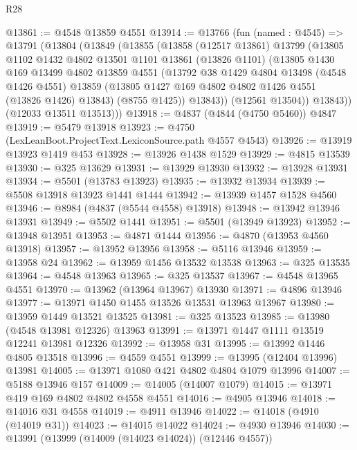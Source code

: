 \begin{lexlean}{R28}
\begin{coremodule}
@13861 := @4548 @13859 @4551
@13914 := @13766
    (fun (named : @4545) =>
    @13791
      (@13804
        (@13849
          (@13855
            (@13858
              (@12517 @13861)
              @13799
              (@13805
                @1102
                @1432
                @4802
                @13501
                @1101
                @13861
                (@13826 @1101)
                (@13805
                  @1430
                  @169
                  @13499
                  @4802
                  @13859
                  @4551
                  (@13792
                    @38
                    @1429
                    @4804
                    @13498
                    (@4548 @1426 @4551)
                    @13859
                    (@13805 @1427 @169 @4802 @4802 @1426 @4551 (@13826 @1426) @13843)
                    (@8755 @1425))
                  @13843))
              (@12561 @13504))
            @13843))
        (@12033 @13511 @13513)))
@13918 := @4837 (@4844 (@4750 @5460)) @4847
@13919 := @5479 @13918
@13923 := @4750 (LexLeanBoot.ProjectText.LexiconSource.path @4557 @4543)
@13926 := @13919 @13923 @1419 @453
@13928 := @13926 @1438 @1529
@13929 := @4815 @13539
@13930 := @325 @13629
@13931 := @13929 @13930
@13932 := @13928 @13931
@13934 := @5501 (@13783 @13923)
@13935 := @13932 @13934
@13939 := @5508 @13918 @13923 @1441 @1444
@13942 := @13939 @1457 @1528 @4560
@13946 := @8984 (@4837 (@5544 @4558) @13918)
@13948 := @13942 @13946 @13931
@13949 := @5502 @1441
@13951 := @5501 (@13949 @13923)
@13952 := @13948 @13951
@13953 := @4871 @1444
@13956 := @4870 (@13953 @4560 @13918)
@13957 := @13952 @13956
@13958 := @5116 @13946
@13959 := @13958 @24
@13962 := @13959 @1456 @13532 @13538
@13963 := @325 @13535
@13964 := @4548 @13963
@13965 := @325 @13537
@13967 := @4548 @13965 @4551
@13970 := @13962 (@13964 @13967) @13930
@13971 := @4896 @13946
@13977 := @13971 @1450 @1455 @13526 @13531 @13963 @13967
@13980 := @13959 @1449 @13521 @13525
@13981 := @325 @13523
@13985 := @13980 (@4548 @13981 @12326) @13963
@13991 := @13971 @1447 @1111 @13519 @12241 @13981 @12326
@13992 := @13958 @31
@13995 := @13992 @1446 @4805 @13518
@13996 := @4559 @4551
@13999 := @13995 (@12404 @13996) @13981
@14005 := @13971 @1080 @421 @4802 @4804 @1079 @13996
@14007 := @5188 @13946 @157
@14009 := @14005 (@14007 @1079)
@14015 := @13971 @419 @169 @4802 @4802 @4558 @4551
@14016 := @4905 @13946
@14018 := @14016 @31 @4558
@14019 := @4911 @13946
@14022 := @14018 (@4910 (@14019 @31))
@14023 := @14015 @14022
@14024 := @4930 @13946
@14030 := @13991 (@13999 (@14009 (@14023 @14024)) (@12446 @4557))

\end{coremodule}
\end{lexlean}

